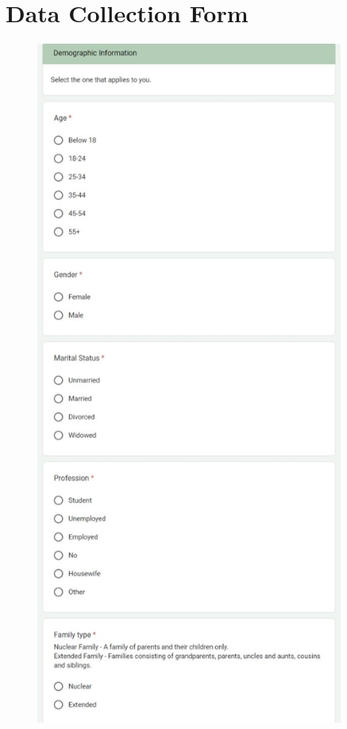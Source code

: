 \documentclass[12pt, english]{article}
\begin{document}
\chapter{Data Collection Form}
\centering
\begin{figure}[h]
    \centering
    \begin{minipage}{0.45\textwidth}
        \centering
        \includegraphics[width=0.9\textwidth]{images/demo.jpeg} %

\end{minipage}
\end{figure}
\end{document}

